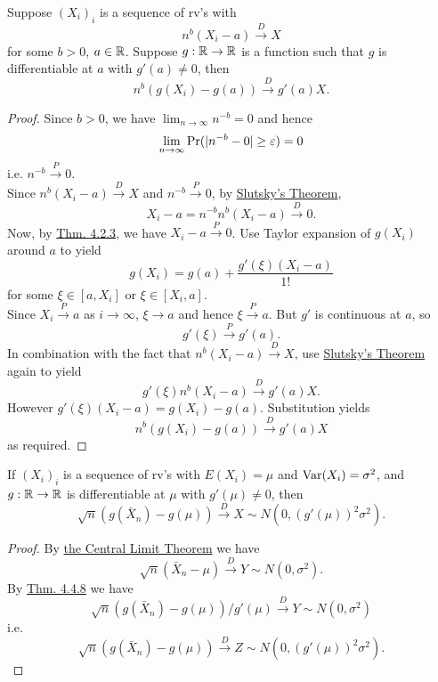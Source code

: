 \documentclass[11pt,fleqn]{book} %
\begin{document}
\begin{theorem}
\label{thm:448}
Suppose \((X_i)_i\) is a sequence of rv's with
\[
n^b(X_i - a) \xrightarrow{D} X
\]
for some \(b > 0\), \(a \in \mathbb{R}\). Suppose \(g:\mathbb{R}\rightarrow\mathbb{R}\) is a function such that \(g\) is differentiable at \(a\) with \(g'(a) \neq 0\), then
\[
n^b(g(X_i) - g(a)) \xrightarrow{D} g'(a)X.
\]
\end{theorem}
\begin{proof}
Since \(b > 0\), we have \(\lim_{n\rightarrow\infty} n^{-b} = 0\) and hence
\[
\lim_{n\rightarrow\infty}\Pr(|n^{-b} - 0| \geq \varepsilon) = 0
\]
i.e. \(n^{-b} \xrightarrow{P} 0\).\\
\indent Since \(n^b(X_i - a)\xrightarrow{D} X\) and \(n^{-b} \xrightarrow{P}0\), by \hyperref[thm:447]{Slutsky's Theorem},
\[
X_i - a = n^{-b}n^b(X_i - a) \xrightarrow{D} 0.
\]
\indent Now, by \hyperref[thm:423]{Thm. 4.2.3}, we have \(X_i - a \xrightarrow{P} 0\). Use Taylor expansion of \(g(X_i)\) around \(a\) to yield
\[
g(X_i) = g(a) + \frac{g'(\xi)(X_i - a)}{1!}
\]
for some \(\xi \in [a, X_i]\) or \(\xi \in [X_i, a]\).\\
\indent Since \(X_i \xrightarrow{P}a\) as \(i\rightarrow\infty\), \(\xi\rightarrow a\) and hence \(\xi \xrightarrow{P}a\). But \(g'\) is continuous at \(a\), so
\[
g'(\xi) \xrightarrow{P} g'(a).
\]
\indent In combination with the fact that \(n^b(X_i - a)\xrightarrow{D}X\), use \hyperref[thm:447]{Slutsky's Theorem} again to yield
\[
g'(\xi)n^b(X_i - a) \xrightarrow{D} g'(a)X.
\]
\indent However \(g'(\xi)(X_i - a) = g(X_i) - g(a)\). Substitution yields
\[
n^b(g(X_i) - g(a)) \xrightarrow{D} g'(a)X
\]
as required.
\end{proof}

\begin{corollary} \label{cor:449}
If \((X_i)_i\) is a sequence of rv's with \(E(X_i) = \mu\) and \(\operatorname{Var}(X_i) = \sigma^2\), and \(g:\mathbb{R}\rightarrow\mathbb{R}\) is differentiable at \(\mu\) with \(g'(\mu) \neq 0\), then
\[
\sqrt{n}(g(\bar{X}_n) - g(\mu)) \xrightarrow{D} X \sim N(0, (g'(\mu))^2\sigma^2).
\]
\end{corollary}
\begin{proof} By \hyperref[thm:443]{the Central Limit Theorem} we have
\[
\sqrt{n}(\bar{X}_n - \mu) \xrightarrow{D} Y \sim N(0, \sigma^2).
\]
\indent By \hyperref[thm:448]{Thm. 4.4.8} we have
\[
\sqrt{n}(g(\bar{X}_n) - g(\mu)) / g'(\mu) \xrightarrow{D} Y \sim N(0, \sigma^2)
\]
i.e.
\[
\sqrt{n}(g(\bar{X}_n) - g(\mu)) \xrightarrow{D} Z \sim N(0, (g'(\mu))^2\sigma^2).
\]
\end{proof}
\end{document}
